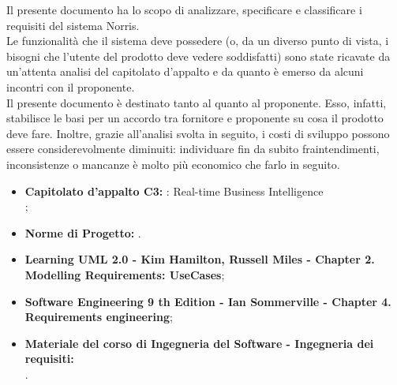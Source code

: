 
		Il presente documento ha lo scopo di analizzare, specificare e classificare i requisiti del sistema Norris.\\
		Le funzionalità che il sistema deve possedere (o, da un diverso punto di vista, i bisogni che l'utente del prodotto deve vedere soddisfatti) sono state ricavate da un'attenta analisi del capitolato d'appalto e da quanto è emerso da alcuni incontri con il proponente.\\
		Il presente documento è destinato tanto al \groupname{} quanto al proponente. Esso, infatti, stabilisce le basi per un accordo tra fornitore e proponente su cosa il prodotto deve fare. Inoltre, grazie all'analisi svolta in seguito, i costi di sviluppo possono essere considerevolmente diminuiti: individuare fin da subito fraintendimenti, inconsistenze o mancanze è molto più economico che farlo in seguito.
	
	

		\begin{itemize}
			\item\textbf{Capitolato d'appalto C3:} \projectname{}: Real-time Business Intelligence \\
				;
			\item \textbf{Norme di Progetto:} .
		\end{itemize}
		\begin{itemize}
			\item \textbf{Learning UML 2.0 - Kim Hamilton, Russell Miles - Chapter 2. Modelling Requirements: UseCases};
			\item \textbf{Software Engineering 9 th Edition - Ian Sommerville - Chapter 4. Requirements engineering};
			\item \textbf{Materiale del corso di Ingegneria del Software - Ingegneria dei requisiti:} \\
				.
		\end{itemize}
